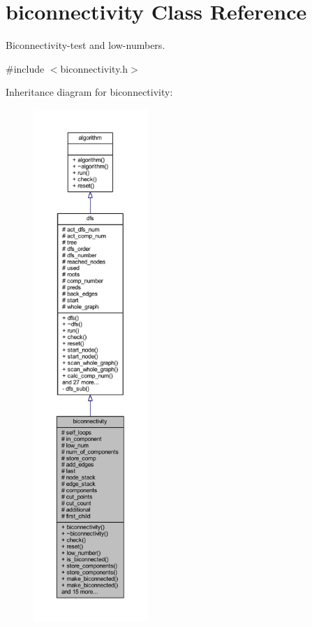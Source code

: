 \hypertarget{classbiconnectivity}{}\section{biconnectivity Class Reference}
\label{classbiconnectivity}


Biconnectivity-\/test and low-\/numbers.  




{\ttfamily \#include $<$biconnectivity.\+h$>$}



Inheritance diagram for biconnectivity\+:\nopagebreak
\begin{figure}[H]
\begin{center}
\leavevmode
\includegraphics[height=550pt]{classbiconnectivity__inherit__graph}
\end{center}
\end{figure}


